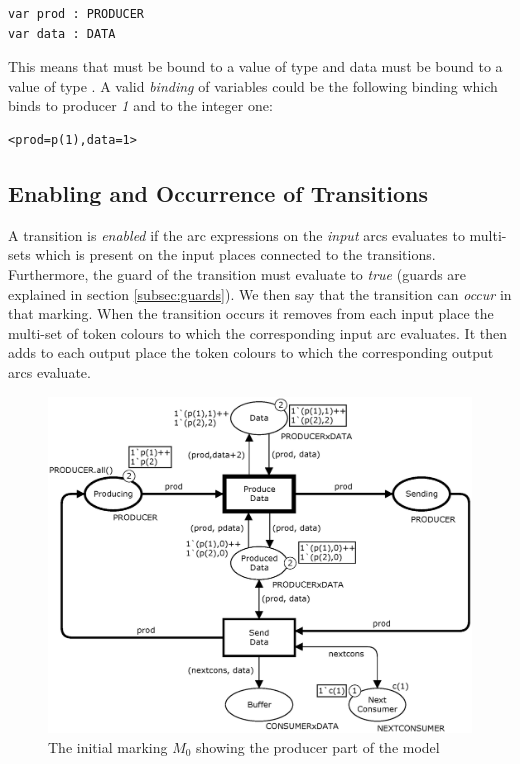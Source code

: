 \begin{verbatim}
var prod : PRODUCER
var data : DATA
\end{verbatim}

\noindent
This means that  must be bound to a value of type  and data must be bound to a value of type . A valid \emph{binding} of variables could be the following binding which binds  to producer \emph{1} and  to the integer one:

\begin{verbatim}
<prod=p(1),data=1>
\end{verbatim}


\subsection{Enabling and Occurrence of Transitions}
A transition is \emph{enabled} if the arc expressions on the \emph{input} arcs evaluates to multi-sets which is present on the input places connected to the transitions. Furthermore, the guard of the transition must evaluate to \emph{true} (guards are explained in section \ref{subsec:guards}). We then say that the transition can \emph{occur} in that marking. When the transition occurs it removes from each input place the multi-set of token colours to which the corresponding input arc evaluates. It then adds to each output place the token colours to which the corresponding output arcs evaluate.

\begin{figure}
\centering
\includegraphics[scale=0.40]{background/graphics/SystemProducerM0.eps}
\caption{The initial marking $M_0$ showing the producer part of the model}
\label{fig:systemmoduleProducerM0}
\end{figure}

